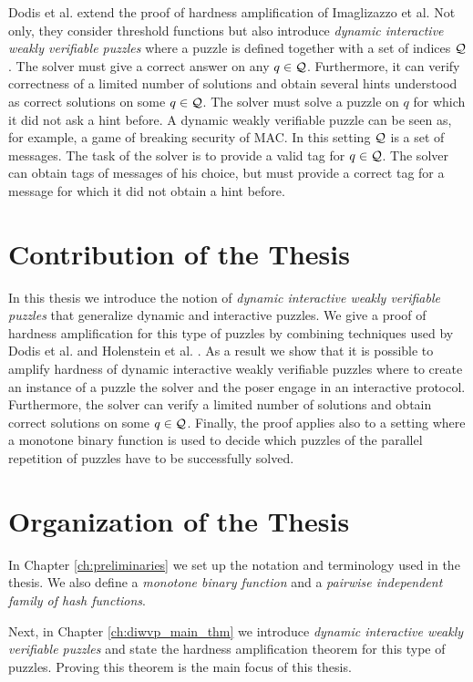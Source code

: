Dodis et al. \cite{dodis2009security} extend the proof of hardness amplification of Imaglizazzo et al.
Not only, they consider threshold functions but also introduce \textit{dynamic interactive weakly verifiable puzzles} where a puzzle is defined together with a set of indices $\mathcal{Q}$.
The solver must give a correct answer on any $q \in \mathcal{Q}$. Furthermore, it can verify correctness of a limited number of solutions and
obtain several hints understood as correct solutions on some $q \in \mathcal{Q}$. The solver must solve a puzzle on $q$ for which it did not ask a hint before.
A dynamic weakly verifiable puzzle can be seen as, for example, a game of breaking security of MAC.
In this setting $\mathcal{Q}$ is a set of messages. The task of the solver is to provide a valid tag for $q \in \mathcal{Q}$.
The solver can obtain tags of messages of his choice, but must provide a correct tag for a message for which it did not obtain a hint before.

\section{Contribution of the Thesis}
In this thesis we introduce the notion of \textit{dynamic interactive weakly verifiable puzzles} that generalize dynamic and interactive puzzles.
We give a proof of hardness amplification for this type of puzzles by combining techniques
used by Dodis et al. \cite{dodis2009security} and Holenstein et al. \cite{holenstein2011general}.
As a result we show that it is possible to amplify hardness of dynamic interactive weakly verifiable puzzles where
to create an instance of a puzzle the solver and the poser engage in an interactive protocol.
Furthermore, the solver can verify a limited number of solutions and obtain correct solutions on some $q \in \mathcal{Q}$.
Finally, the proof applies also to a setting where a monotone binary function is used to decide which puzzles of the parallel repetition of puzzles
have to be successfully solved.
%
\section{Organization of the Thesis}
In Chapter \ref{ch:preliminaries} we set up the notation and terminology used in the thesis.
We also define a \textit{monotone binary function} and a \textit{pairwise independent family of hash functions}.

Next, in Chapter \ref{ch:diwvp_main_thm} we introduce \textit{dynamic interactive weakly verifiable
puzzles} and state the hardness amplification theorem for this type of puzzles.
Proving this theorem is the main focus of this thesis.

